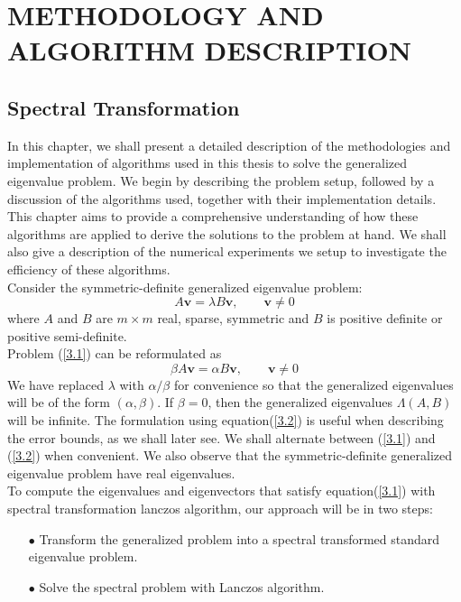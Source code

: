 \chapter{METHODOLOGY AND ALGORITHM DESCRIPTION}
\newtheorem{lemma}[theorem]{Lemma}
\section{Spectral Transformation}
In this chapter, we shall present a detailed description of the methodologies and implementation of algorithms used in this thesis to solve the generalized eigenvalue problem. We begin by describing the problem setup, followed by a discussion of the algorithms used, together with their implementation details. This chapter aims to provide a comprehensive understanding of how these algorithms are applied to derive the solutions to the problem at hand. We shall also give a description of the numerical experiments we setup to investigate the efficiency of these algorithms.\\
Consider the symmetric-definite generalized eigenvalue problem:
\begin{equation}\label{3.1}
	A\mathbf{v} = \lambda B\mathbf{v}, \qquad \mathbf{v} \neq 0
\end{equation}
where $A$ and $B$ are $m \times m$ real, sparse, symmetric and $B$ is positive definite or positive semi-definite.\\
Problem (\ref{3.1}) can be reformulated  as
\begin{equation}\label{3.2}
	\beta A\mathbf{v} = \alpha B\mathbf{v}, \qquad \mathbf{v} \neq 0
\end{equation}
We have replaced $\lambda$ with $\alpha/\beta$ for convenience so that the generalized eigenvalues will be of the form $(\alpha, \beta)$. If $ \beta = 0$, then the generalized eigenvalues $\Lambda(A, B)$ will be infinite. The formulation using equation(\ref{3.2}) is useful when describing the error bounds, as we shall later see. We shall alternate between (\ref{3.1}) and (\ref{3.2}) when convenient. We also observe that the symmetric-definite generalized eigenvalue problem have real eigenvalues.\\
To compute the eigenvalues and eigenvectors that satisfy equation(\ref{3.1}) with spectral transformation lanczos algorithm, our approach will be in two steps:
\begin{itemize}
	\item[$\bullet$] Transform the generalized problem into a spectral transformed standard eigenvalue problem.
	\item[$\bullet$] Solve the spectral problem with Lanczos algorithm.
\end{itemize}
